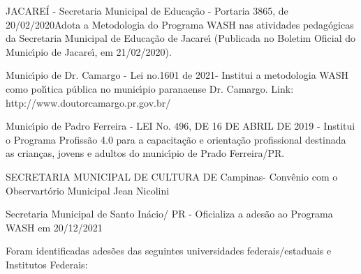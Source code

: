 \documentclass[
12pt,		%
openright,	%
twoside,  %
a4paper,			%
chapter=TITLE,		%
english,			%
french,				%
spanish,			%
brazil				%
]{USPSC-classe/USPSC}
\begin{document}
\begin{alineas}
\item JACARE\'I - Secretaria Municipal de Educa\c{c}\~ao - Portaria 3865, de 20/02/2020Adota a Metodologia do Programa WASH nas atividades pedag\'ogicas da Secretaria Municipal de Educa\c{c}\~ao de Jacare\'{\i} (Publicada no Boletim Oficial do Munic\'{\i}pio de Jacare\'{\i}, em 21/02/2020).
\item Munic\'{\i}pio de Dr. Camargo - Lei no.1601 de 2021- Institui a metodologia WASH como pol\'{\i}tica p\'ublica no munic\'{\i}pio paranaense Dr. Camargo. Link: http://www.doutorcamargo.pr.gov.br/
\item Munic\'{\i}pio de Padro Ferreira - LEI No. 496, DE 16 DE ABRIL DE 2019 - Institui o Programa Profiss\~ao 4.0 para a capacita\c{c}\~ao e orienta\c{c}\~ao profissional destinada as crian\c{c}as, jovens e adultos do munic\'{\i}pio de Prado Ferreira/PR.
\item SECRETARIA MUNICIPAL DE CULTURA DE Campinas- Conv\^enio com o Observart\'orio Municipal Jean Nicolini
\item Secretaria Municipal de Santo In\'acio/ PR - Oficializa a ades\~ao ao Programa WASH em  20/12/2021
\end{alineas}

Foram identificadas ades\~oes das seguintes universidades federais/estaduais e Institutos Federais:
\end{document}
